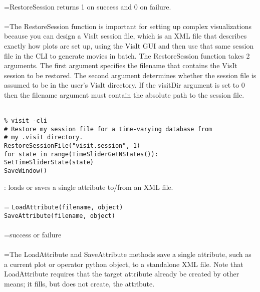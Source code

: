 \documentclass[10pt,a4paper]{report}
\begin{document}
 \\ 
\hangindent=\parindent RestoreSession returns 1 on success and 0 on failure. \\[-3mm] 

 \\ 
\hangindent=\parindent The RestoreSession function is important for setting up complex visualizations because you can design a VisIt session file, which is an XML file that describes exactly how plots are set up, using the VisIt GUI and then use that same session file in the CLI to generate movies in batch. The RestoreSession function takes 2 arguments. The first argument specifies the filename that contains the VisIt session to be restored. The second argument determines whether the session file is assumed to be in the user's VisIt directory. If the visitDir argument is set to 0 then the filename argument must contain the absolute path to the session file. \\[-3mm] 

\\[-6mm]
\begin{verbatim}% visit -cli
# Restore my session file for a time-varying database from 
# my .visit directory.
RestoreSessionFile("visit.session", 1)
for state in range(TimeSliderGetNStates()):
SetTimeSliderState(state)
SaveWindow()
\end{verbatim}
\newpage


{}
: loads or saves a single attribute to/from an XML file.\\[-3mm]

 \\ 
\hangindent=\parindent 
\verb!LoadAttribute(filename, object)!\\ 
\verb!SaveAttribute(filename, object)!\\ [-3mm]

 \\ 
\hangindent=\parindent success or failure \\[-3mm] 

 \\ 
\hangindent=\parindent The LoadAttribute and SaveAttribute methods save a single attribute, such as a current plot or operator python object, to a standalone XML file.  Note that LoadAttribute requires that the target attribute already be created by other means; it fills, but does not create, the attribute. \\[-3mm] 
\end{document}
